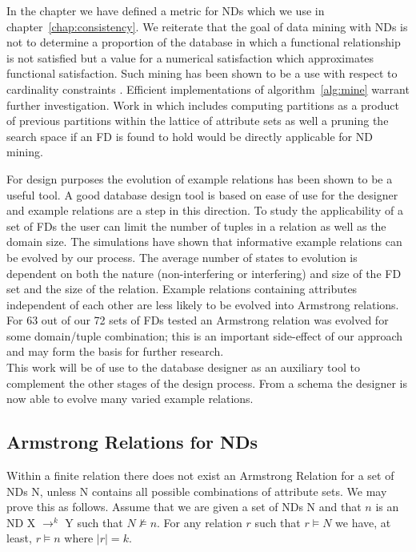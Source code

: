 In the chapter we have defined a metric for NDs which we use in
chapter~\ref{chap:consistency}. We reiterate that the goal of data
mining with NDs is not to determine a proportion of the database in
which a functional relationship is not satisfied but a value for a
numerical satisfaction which approximates functional
satisfaction. Such mining has been shown to be a use with respect to
cardinality constraints \cite{sou98}. Efficient implementations of
algorithm~\ref{alg:mine} 
warrant further investigation. Work in \cite{hkp98} which
includes computing partitions as a product of previous partitions within
the lattice of attribute sets as well a pruning the search space if an
FD is found to hold would be directly applicable for ND mining.

\medskip

For design purposes the evolution of example relations has been shown to
be a useful tool.  A good database
design tool is based on ease of use for the designer and example relations
are a step in this direction. To study the applicability of a set of FDs
 the user can limit the number of tuples in
a relation as well as the domain size. The simulations have shown that 
informative example relations can be evolved by our process.  The 
average number of states to evolution is dependent on both
the nature (non-interfering or interfering) and size of the FD set and the size of the relation.
Example relations containing attributes independent of each other
are less likely to be evolved into Armstrong relations. For 63 out
of our 72 sets of FDs tested an Armstrong relation was evolved
for some domain/tuple combination; this is an important side-effect
of our approach and may form the basis for further research.\\

This work
will be of use to the database designer as an auxiliary tool to complement
the other stages of the design process.  From a schema the designer is now
 able to evolve many varied example relations.\\

\subsection{Armstrong Relations for NDs}\label{subsec:nd_ar}

Within a finite relation there does not exist an
Armstrong Relation for a set of NDs N, unless N contains all possible
combinations of attribute sets. We may prove this as follows. Assume that we
are given a set of NDs N and that $n$ is an ND X $\to^k$ Y such that
$N \not\models n$. For any relation $r$ such that $r \models N$ we
have, at least, $r \models n$ where $\mid r \mid = k$.

